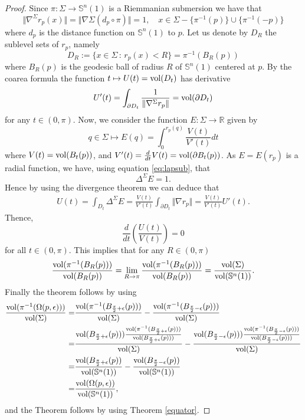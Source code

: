 \documentclass[11pt,letterpaper]{amsart}
\theoremstyle{definition}
\theoremstyle{remark}
\newcommand{\ese}{\mathbb{S}}
\begin{document}
\begin{proof}
Since $\pi:\Sigma \rightarrow \ese^n(1)$ is a Riemmanian submersion we have that
$$
\Vert \nabla^\Sigma r_p(x)\Vert =\Vert \nabla\Sigma \left(d_p\circ \pi\right)\Vert=1, \quad x\in \Sigma-\{\pi^{-1}(p)\}\cup \{\pi^{-1}(-p) \}
$$
where  $d_p$ is the distance function on $\mathbb{S}^n(1)$ to $p$. 
Let us denote by $D_R$ the sublevel sets of $r_p$, namely
$$
D_R:=\{x\in \Sigma\, : \, r_p(x)<R\}=\pi^{-1}(B_R(p))
$$
where $B_R(p)$ is the geodesic ball of radius $R$ of $\mathbb{S}^n(1)$ centered at $p$. By the coarea formula the function $t\mapsto U(t)={\rm vol}(D_t)$ has derivative
$$
U'(t)=\int_{\partial D_t}\frac{1}{\Vert \nabla^\Sigma r_p\Vert}={\rm vol}(\partial D_t)
$$
for any $t\in (0,\pi)$. Now, we consider the function $E:\Sigma\to \mathbb{R}$ given by
$$
q\in \Sigma\mapsto E(q)=\int_0^{r_p(q)}\frac{V(t)}{V'(t)}dt
$$
where $V(t)={\rm vol}(B_t(p))$, and $V'(t)=\frac{d}{dt}V(t)={\rm vol }(\partial B_t(p))$. As  $E=E(r_p)$ is a radial function, we have, using equation \eqref{eq:lapsub}, that
$$
\Delta^{\Sigma}E=1.
$$
Hence by using the divergence theorem we can deduce that
$$
\begin{aligned}
    U(t)=\int_{D_t}\Delta^\Sigma E=\frac{V(t)}{V'(t)}\int_{\partial D_t}\Vert \nabla r_p\Vert=\frac{V(t)}{V'(t)}U'(t).
\end{aligned}
$$
Thence,
$$
\frac{d}{dt}\left(\frac{U(t)}{V(t)}\right)=0
$$
for all $t\in (0,\pi)$. This implies that for any $R\in(0,\pi)$
$$
\frac{{\rm vol}(\pi^{-1}(B_R(p)))}{{\rm vol}(B_R(p))}=\lim_{R\to \pi}\frac{{\rm vol}(\pi^{-1}(B_R(p)))}{{\rm vol}(B_R(p))}=\frac{{\rm vol}(\Sigma)}{{\rm vol}(\mathbb{S}^n(1))}.
$$
Finally the theorem follows by using
$$
\begin{aligned}
\frac{{\rm vol}(\pi^{-1}(\Omega(p,\epsilon)))}{{\rm vol}(\Sigma)}=&\frac{{\rm vol}(\pi^{-1}(B_{\frac{\pi}{2}+\epsilon}(p)))}{{\rm vol}(\Sigma)}-\frac{{\rm vol}(\pi^{-1}(B_{\frac{\pi}{2}-\epsilon}(p)))}{{\rm vol}(\Sigma)}  \\
=&\frac{{\rm vol}(B_{\frac{\pi}{2}+\epsilon}(p)))\frac{{\rm vol}(\pi^{-1}(B_{\frac{\pi}{2}+\epsilon}(p)))}{
{\rm vol}(B_{\frac{\pi}{2}+\epsilon}(p)))}}{{\rm vol}(\Sigma)}-\frac{{\rm vol}(B_{\frac{\pi}{2}-\epsilon}(p)))\frac{{\rm vol}(\pi^{-1}(B_{\frac{\pi}{2}-\epsilon}(p)))}{
{\rm vol}(B_{\frac{\pi}{2}-\epsilon}(p)))}}{{\rm vol}(\Sigma)}\\
=&\frac{{\rm vol}(B_{\frac{\pi}{2}+\epsilon}(p))}{{\rm vol}(\mathbb{S}^n(1))}-\frac{{\rm vol}(B_{\frac{\pi}{2}-\epsilon}(p))}{{\rm vol}(\mathbb{S}^n(1))}\\
=&\frac{{\rm vol}(\Omega(p,\epsilon))}{{\rm vol}(\mathbb{S}^n(1))},
\end{aligned}
$$
and the Theorem follows by using Theorem \ref{equator}.

\end{proof}
\end{document}
